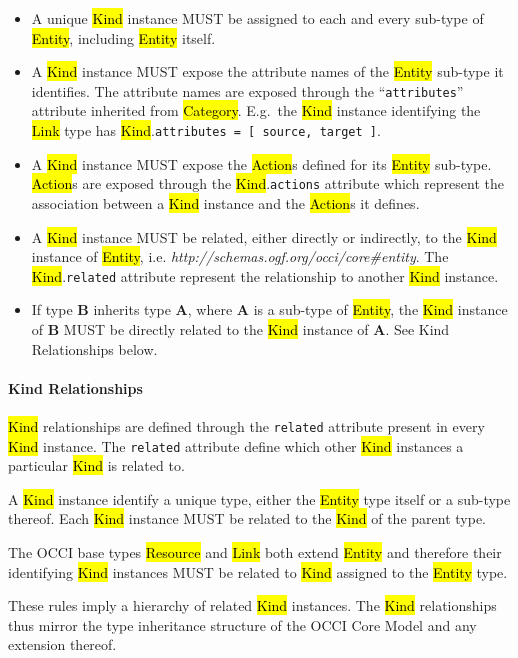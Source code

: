 \documentclass[10pt,a4paper]{article}
\begin{document}
\begin{itemize}
  \item A unique \hl{Kind} instance MUST be assigned to each and every
    sub-type of \hl{Entity}, including \hl{Entity} itself.
  \item A \hl{Kind} instance MUST expose the attribute names of the
    \hl{Entity} sub-type it identifies. The attribute names are
    exposed through the ``{\tt attributes}'' attribute inherited from
    \hl{Category}. E.g.~the \hl{Kind} instance identifying the
    \hl{Link} type has \hl{Kind}.{\tt attributes = [ source, target
    ]}.
  \item A \hl{Kind} instance MUST expose the \hl{Action}s defined for
    its \hl{Entity} sub-type. \hl{Action}s are exposed through the
    \hl{Kind}.{\tt actions} attribute which represent the association
    between a \hl{Kind} instance and the \hl{Action}s it defines.
  \item A \hl{Kind} instance MUST be related, either directly or
    indirectly, to the \hl{Kind} instance of \hl{Entity},
    i.e. \textit{http://schemas.ogf.org/occi/core\#entity}.  The
    \hl{Kind}.{\tt related} attribute represent the relationship to
    another \hl{Kind} instance.
  \item If type {\bf B} inherits type {\bf A}, where {\bf A} is a
    sub-type of \hl{Entity}, the \hl{Kind} instance of {\bf B} MUST be
    directly related to the \hl{Kind} instance of {\bf A}. See Kind
    Relationships below.
\end{itemize}

\paragraph*{Kind Relationships}
\hl{Kind} relationships are defined through the {\tt related}
attribute present in every \hl{Kind} instance. The {\tt related}
attribute define which other \hl{Kind} instances a particular
\hl{Kind} is related to.

A \hl{Kind} instance identify a unique type, either the \hl{Entity}
type itself or a sub-type thereof.  Each \hl{Kind} instance MUST be
related to the \hl{Kind} of the parent type.

The OCCI base types \hl{Resource} and \hl{Link} both extend
\hl{Entity} and therefore their identifying \hl{Kind} instances MUST
be related to \hl{Kind} assigned to the \hl{Entity} type.

These rules imply a hierarchy of related \hl{Kind} instances. The
\hl{Kind} relationships thus mirror the type inheritance structure of
the OCCI Core Model and any extension thereof.
\end{document}
